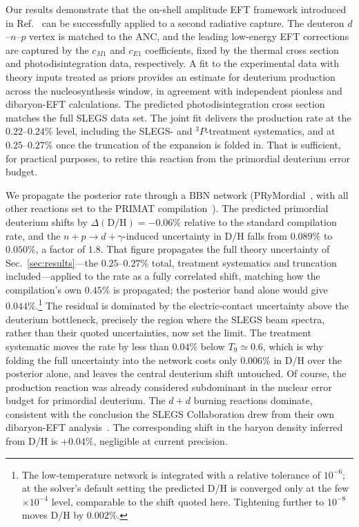 \documentclass[
  aps,prd,twocolumn,nofootinbib,superscriptaddress,
  longbibliography,floatfix,preprintnumbers
]{revtex4-2}
\newcommand{\npdg}{n+p\to d+\gamma}
\newcommand{\Mone}{M1}
\newcommand{\Eone}{E1}
\begin{document}
Our results demonstrate that the on-shell amplitude EFT framework introduced in
Ref.~\cite{Tait:2026guk} can be successfully applied to a second radiative capture. 
The deuteron $d$--$n$--$p$ vertex is matched to the ANC, and the leading low-energy
EFT corrections are captured by the $c_{\Mone}$ and $c_{\Eone}$ coefficients, fixed by the thermal cross section
and photodisintegration data, respectively.   A fit to the experimental data with theory inputs treated as priors provides
an estimate for deuterium production across the nucleosynthesis window, in agreement with
independent pionless and dibaryon-EFT calculations. The predicted
photodisintegration cross section matches the full SLEGS data set. The joint fit delivers the production rate at the
$0.22$--$0.24\%$ level, including the SLEGS- and ${}^{3}P$-treatment systematics, and
at $0.25$--$0.27\%$ once the truncation of the expansion is folded in. That is sufficient, for
practical purposes, to retire this reaction from the primordial deuterium error
budget.

We propagate the posterior rate through a BBN network
(PRyMordial~\cite{Burns:2023sgx}, with all other reactions set to the PRIMAT
compilation~\cite{Pitrou:2018cgg}). The predicted primordial deuterium shifts by
$\Delta(\mathrm{D/H})=-0.06\%$ relative to the standard compilation rate, and
the $\npdg$-induced uncertainty in D/H falls from $0.089\%$ to
$0.050\%$, a factor of $1.8$. That figure propagates the full theory uncertainty of
Sec.~\ref{sec:results}---the $0.25$--$0.27\%$ total, treatment systematics and
truncation included---applied to the rate as a fully correlated shift, matching how
the compilation's own $0.45\%$ is propagated; the posterior band alone would give
$0.044\%$.\footnote{The low-temperature network is
integrated with a relative tolerance of $10^{-6}$; at the solver's default
setting the predicted D/H is converged only at the few$\times10^{-4}$ level,
comparable to the shift quoted here. Tightening further to $10^{-8}$ moves D/H
by $0.002\%$.} The residual is dominated
by the electric-contact uncertainty above the deuterium bottleneck, precisely the
region where the SLEGS beam spectra, rather than their quoted uncertainties, now set
the limit. The treatment
systematic moves the rate by less than $0.04\%$ below $T_{9}\simeq0.6$, which is why
folding the full uncertainty into the network costs only $0.006\%$ in D/H over the
posterior alone, and leaves the central deuterium shift untouched. Of course, the production reaction was already considered 
subdominant in the nuclear error budget for primordial deuterium.  The $d+d$ burning reactions dominate,
consistent with the conclusion the SLEGS Collaboration drew from their own
dibaryon-EFT analysis~\cite{Chen:2025oyj}. The corresponding shift in the baryon
density inferred from D/H is $+0.04\%$, negligible at current precision.
\end{document}
